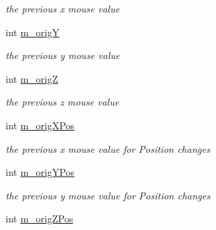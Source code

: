 \begin{DoxyCompactItemize}
\begin{DoxyCompactList}\small\item\em the previous x mouse value \item\end{DoxyCompactList}\item 
\hypertarget{classNGLDraw_a0a5256c5495d42796ac03b98655a2040}{
int \hyperlink{classNGLDraw_a0a5256c5495d42796ac03b98655a2040}{m\_\-origY}}
\label{classNGLDraw_a0a5256c5495d42796ac03b98655a2040}

\begin{DoxyCompactList}\small\item\em the previous y mouse value \item\end{DoxyCompactList}\item 
\hypertarget{classNGLDraw_a5fba1120bcef1ec56a7687270510f8d7}{
int \hyperlink{classNGLDraw_a5fba1120bcef1ec56a7687270510f8d7}{m\_\-origZ}}
\label{classNGLDraw_a5fba1120bcef1ec56a7687270510f8d7}

\begin{DoxyCompactList}\small\item\em the previous z mouse value \item\end{DoxyCompactList}\item 
\hypertarget{classNGLDraw_a2145fe76e0b468fd4ec2c3832018037f}{
int \hyperlink{classNGLDraw_a2145fe76e0b468fd4ec2c3832018037f}{m\_\-origXPos}}
\label{classNGLDraw_a2145fe76e0b468fd4ec2c3832018037f}

\begin{DoxyCompactList}\small\item\em the previous x mouse value for Position changes \item\end{DoxyCompactList}\item 
\hypertarget{classNGLDraw_ace90d67bf9444364656f329b9a80c234}{
int \hyperlink{classNGLDraw_ace90d67bf9444364656f329b9a80c234}{m\_\-origYPos}}
\label{classNGLDraw_ace90d67bf9444364656f329b9a80c234}

\begin{DoxyCompactList}\small\item\em the previous y mouse value for Position changes \item\end{DoxyCompactList}\item 
\hypertarget{classNGLDraw_ac7368aa2afeab2c0061d07801ca31990}{
int \hyperlink{classNGLDraw_ac7368aa2afeab2c0061d07801ca31990}{m\_\-origZPos}}
\label{classNGLDraw_ac7368aa2afeab2c0061d07801ca31990}


\end{DoxyCompactItemize}
